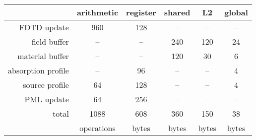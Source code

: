 \begin{tabular}{r c c c c c}
	  & arithmetic & register & shared & L2 & global \\
  \hline
  FDTD update        &  960 & 128 &  -- &  -- & -- \\
  field buffer       &   -- &  -- & 240 & 120 & 24 \\
  material buffer    &   -- &  -- & 120 &  30 &  6 \\
  absorption profile &   -- &  96 &  -- &  -- &  4 \\ 
  source profile     &   64 & 128 &  -- &  -- &  4 \\ 
  PML update         &   64 & 256 &  -- &  -- & -- \\
  \hline
  total              & 1088 & 608 & 360 & 150 & 38 \\
	  & operations & bytes & bytes & bytes & bytes \\
\end{tabular}
